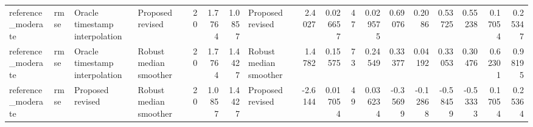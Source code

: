 \begin{table}[!htbp]
{\begin{tabular}{llllrrrlrrrrrrrrrr}
reference_moderate & rmse & Oracle timestamp interpolation & Proposed revised & 20 & 1.7764 & 1.0857 & Proposed revised & 2.4027 & 0.026657 & 47 & 0.029575 & 0.69076 & 0.2086 & 0.53725 & 0.55238 & 0.17054 & 0.25347 \\
reference_moderate & rmse & Oracle timestamp interpolation & Robust median smoother & 20 & 1.7764 & 1.4427 & Robust median smoother & 1.4782 & 0.15575 & 73 & 0.24549 & 0.33377 & 0.04192 & 0.33053 & 0.30476 & 0.62301 & 0.98195 \\
reference_moderate & rmse & Proposed revised & Robust median smoother & 20 & 1.0857 & 1.4427 & Proposed revised & -2.6144 & 0.017054 & 49 & 0.036234 & -0.35699 & -0.12868 & -0.58459 & -0.53333 & 0.17054 & 0.25364 \\
\bottomrule
\end{tabular}
}
\end{table}
